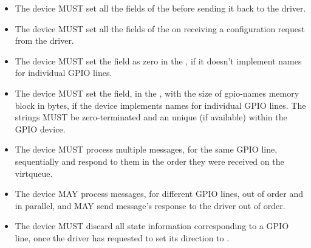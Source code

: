 
\begin{itemize}
\item The device MUST set all the fields of the  before sending it back to the driver.

\item The device MUST set all the fields of the  on receiving a configuration request from the driver.

\item The device MUST set the  field as zero in the
    , if it doesn't implement names for
    individual GPIO lines.

\item The device MUST set the  field, in the
    , with the size of gpio-names memory block
    in bytes, if the device implements names for individual GPIO lines. The
    strings MUST be zero-terminated and an unique (if available) within the GPIO
    device.

\item The device MUST process multiple messages, for the same GPIO line,
    sequentially and respond to them in the order they were received on the
    virtqueue.

\item The device MAY process messages, for different GPIO lines, out of order
    and in parallel, and MAY send message's response to the driver out of order.

\item The device MUST discard all state information corresponding to a GPIO
    line, once the driver has requested to set its direction to
    .
\end{itemize}
